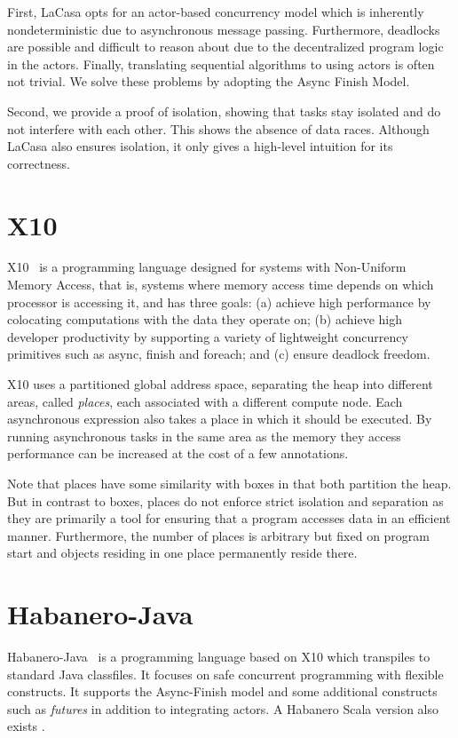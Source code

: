 First, LaCasa opts for an actor-based concurrency model which is inherently nondeterministic due to asynchronous message passing. Furthermore, deadlocks are possible and difficult to reason about due to the decentralized program logic in the actors. Finally, translating sequential algorithms to using actors is often not trivial. We solve these problems by adopting the Async Finish Model.

Second, we provide a proof of isolation, showing that tasks stay isolated and do not interfere with each other. This shows the absence of data races. Although LaCasa also ensures isolation, it only gives a high-level intuition for its correctness.

\section{X10}
X10~\cite{charles_x10_2005} is a programming language designed for systems with Non-Uniform Memory Access, that is, systems where memory access time depends on which processor is accessing it,  and has three goals: (a) achieve high performance by colocating computations with the data they operate on; (b) achieve high developer productivity by supporting a variety of lightweight concurrency primitives such as async, finish and foreach; and (c) ensure deadlock freedom.

X10 uses a partitioned global address space, separating the heap into different areas, called \textit{places}, each associated with a different compute node. Each asynchronous expression also takes a place in which it should be executed. By running asynchronous tasks in the same area as the memory they access performance can be increased at the cost of a few annotations.

Note that places have some similarity with boxes in that both partition the heap. But in contrast to boxes, places do not enforce strict isolation and separation as they are primarily a tool for ensuring that a program accesses data in an efficient manner. Furthermore, the number of places is arbitrary but fixed on program start and objects residing in one place permanently reside there. 

\section{Habanero-Java}
Habanero-Java~\cite{cave_habanero-java_2011} is a programming language based on X10 which transpiles to standard Java classfiles. It focuses on safe concurrent programming with flexible constructs. It supports the Async-Finish model and some additional constructs such as \textit{futures} in addition to integrating actors. A Habanero Scala version also exists \cite{imam_integrating_2012,imam_habanero-scala_2012}.

